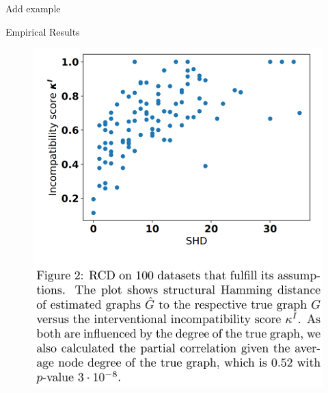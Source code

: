 \documentclass{beamer}
\begin{document}
\begin{frame}
	Add example
\end{frame}


\begin{frame}{Empirical Results}
	\begin{figure}
		\includegraphics[scale=0.12]{imgs/empirical1.png}
	\end{figure}
\end{frame}
\end{document}

